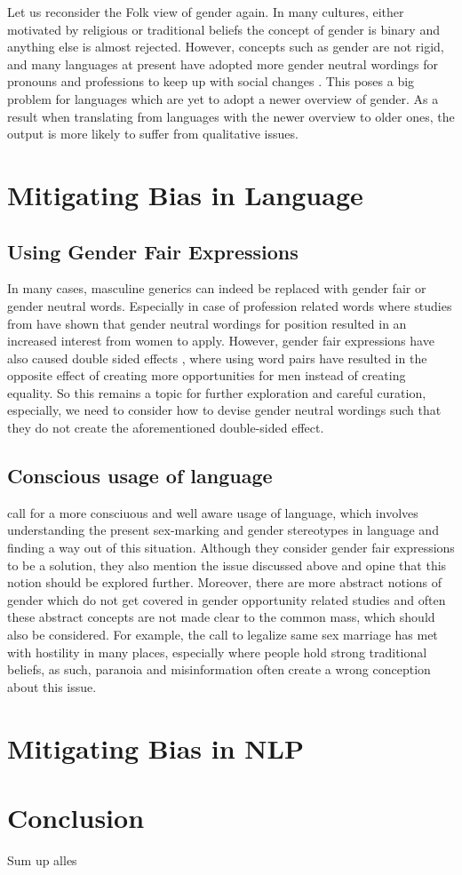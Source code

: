 \documentclass{article}
\begin{document}
\noindent
Let us reconsider the Folk view of gender again. In many cultures, either motivated by religious or traditional beliefs the concept of gender is binary and anything else is almost rejected. However, concepts such as gender are not rigid, and many languages at present have adopted more gender neutral wordings for pronouns and professions to keep up with social changes \cite{misersky2019grammatical}. This poses a big problem for languages which are yet to adopt a newer overview of gender. As a result when translating from languages with the newer overview to older ones, the output is more likely to suffer from qualitative issues. 



\section*{Mitigating Bias in Language}

\subsection*{Using Gender Fair Expressions}
In many cases, masculine generics can indeed be replaced with gender fair or gender neutral words. Especially in case of profession related words where studies from \cite{bem1973does} have shown that gender neutral wordings for position resulted in an increased interest from women to apply. However, gender fair expressions have also caused double sided effects \cite{horvath2016does}, where using word pairs have resulted in the opposite effect of creating more opportunities for men instead of creating equality. So this remains a topic for further exploration and careful curation, especially, we need to consider how to devise gender neutral wordings such that they do not create the aforementioned double-sided effect.

\subsection*{Conscious usage of language}
\cite{menegatti2017gender} call for a more consciuous and well aware usage of language, which involves understanding the present sex-marking and gender stereotypes in language and finding a way out of this situation. Although they consider gender fair expressions to be a solution, they also mention the issue discussed above and opine that this notion should be explored further. Moreover, there are more abstract notions of gender which do not get covered in gender opportunity related studies and often these abstract concepts are not made clear to the common mass, which should also be considered. For example, the call to legalize same sex marriage has met with hostility in many places, especially where people hold strong traditional beliefs, as such, paranoia and misinformation often create a wrong conception about this issue.  

\section*{Mitigating Bias in NLP}


\section*{Conclusion}
Sum up alles

\clearpage


\end{document}
